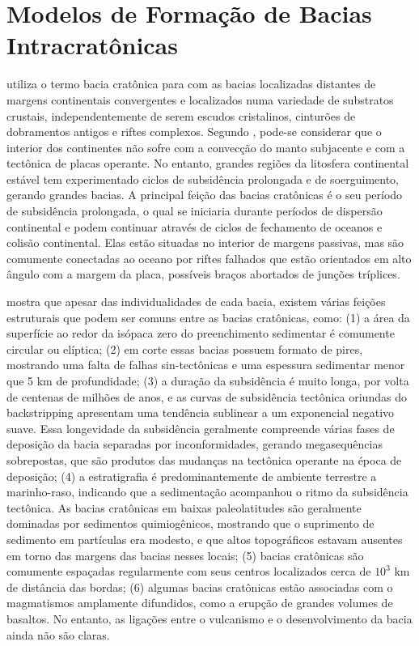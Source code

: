 \chapter{Modelos de Formação de Bacias Intracratônicas}

\cite{allen_cratonic_2012} utiliza o termo bacia cratônica para com as bacias localizadas distantes de margens continentais convergentes e localizados numa variedade de substratos crustais, independentemente de serem escudos cristalinos, cinturões de dobramentos antigos e riftes complexos. Segundo \cite{armitage_subsidence_2010}, pode-se considerar que o interior dos continentes não sofre com a convecção do manto subjacente e com a tectônica de placas operante. No entanto, grandes regiões da litosfera continental estável tem experimentado ciclos de subsidência prolongada e de soerguimento, gerando grandes bacias. A principal feição das bacias cratônicas é o seu período de subsidência prolongada, o qual se iniciaria durante períodos de dispersão continental e podem continuar através de ciclos de fechamento de oceanos e colisão continental. Elas estão situadas no interior de margens passivas, mas são comumente conectadas ao oceano por riftes falhados que estão orientados em alto ângulo com a margem da placa, possíveis braços abortados de junções tríplices.

\cite{allen_cratonic_2012} mostra que apesar das individualidades de cada bacia, existem várias feições estruturais que podem ser comuns entre as bacias cratônicas, como: (1) a área da superfície ao redor da isópaca zero do preenchimento sedimentar é comumente circular ou elíptica; (2) em corte essas bacias possuem formato de pires, mostrando uma falta de falhas sin-tectônicas e uma espessura sedimentar menor que 5 km de profundidade; (3) a duração da subsidência é muito longa, por volta de centenas de milhões de anos, e as curvas de subsidência tectônica oriundas do backstripping apresentam uma tendência sublinear a um exponencial negativo suave. Essa longevidade da subsidência geralmente compreende várias fases de deposição da bacia separadas por inconformidades, gerando megasequências sobrepostas, que são produtos das mudanças na tectônica operante na época de deposição; (4) a estratigrafia é predominantemente de ambiente terrestre a marinho-raso, indicando que a sedimentação acompanhou o ritmo da subsidência tectônica. As bacias cratônicas em baixas paleolatitudes são geralmente dominadas por sedimentos quimiogênicos, mostrando que o suprimento de sedimento em partículas era modesto, e que altos topográficos estavam ausentes em torno das margens das bacias nesses locais; (5) bacias cratônicas são comumente espaçadas regularmente com seus centros localizados cerca de $10^{3}$ km de distância das bordas; (6) algumas bacias cratônicas estão associadas com o magmatismos amplamente difundidos, como a erupção de grandes volumes de basaltos. No entanto, as ligações entre o vulcanismo e o desenvolvimento da bacia ainda não são claras.  

